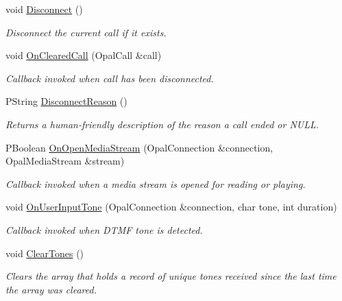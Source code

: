 \begin{CompactItemize}
void \hyperlink{classTelephonyIfc_68160576582be102ace0f4ae277d7129}{Disconnect} ()
\begin{CompactList}\small\item\em Disconnect the current call if it exists. \item\end{CompactList}\item 
void \hyperlink{classTelephonyIfc_7efa2a51fd26f3c5072ee8b7ba09d75c}{OnClearedCall} (OpalCall \&call)
\begin{CompactList}\small\item\em Callback invoked when call has been disconnected. \item\end{CompactList}\item 
PString \hyperlink{classTelephonyIfc_d5e6a50893f0915064f23c8d50de481f}{DisconnectReason} ()
\begin{CompactList}\small\item\em Returns a human-friendly description of the reason a call ended or NULL. \item\end{CompactList}\item 
PBoolean \hyperlink{classTelephonyIfc_f3a2ff3766cf45c203dba5a2260445b1}{OnOpenMediaStream} (OpalConnection \&connection, OpalMediaStream \&stream)
\begin{CompactList}\small\item\em Callback invoked when a media stream is opened for reading or playing. \item\end{CompactList}\item 
void \hyperlink{classTelephonyIfc_085ab0d59a990bda8b17cb56b1baaeb1}{OnUserInputTone} (OpalConnection \&connection, char tone, int duration)
\begin{CompactList}\small\item\em Callback invoked when DTMF tone is detected. \item\end{CompactList}\item 
void \hyperlink{classTelephonyIfc_c471d58342002859cc9a59b1d1e494ca}{ClearTones} ()
\begin{CompactList}\small\item\em Clears the array that holds a record of unique tones received since the last time the array was cleared. \item\end{CompactList}\item 

\end{CompactItemize}
